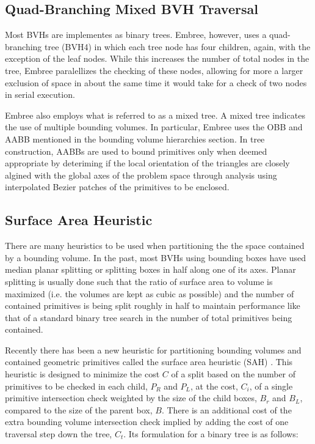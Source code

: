 \documentclass{anstrans}
\begin{document}
\subsection{Quad-Branching Mixed BVH Traversal}

Most BVHs are implementes as binary trees. Embree, however, uses a quad-branching tree (BVH4) in which each tree node has four children, again, with the exception of the leaf nodes. While this increases the number of total nodes in the tree, Embree paralellizes the checking of these nodes, allowing for more a larger exclusion of space in about the same time it would take for a check of two nodes in serial execution. 

Embree also employs what is referred to as a mixed tree. A mixed tree indicates the use of multiple bounding volumes. In particular, Embree uses the OBB and AABB mentioned in the bounding volume hierarchies section. In tree construction, AABBs are used to bound primitives only when deemed appropriate by deteriming if the local orientation of the triangles are closely algined with the global axes of the problem space through analysis using interpolated Bezier patches of the primitives to be enclosed. \cite{embree}

\subsection{Surface Area Heuristic}

There are many heuristics to be used when partitioning the the space contained by a bounding volume. In the past, most BVHs using bounding boxes have used median planar splitting or splitting boxes in half along one of its axes. Planar splitting is usually done such that the ratio of surface area to volume is maximized (i.e. the volumes are kept as cubic as possible) and the number of contained primitives is being split roughly in half to maintain performance like that of a standard binary tree search in the number of total primitives being contained. 

Recently there has been a new heuristic for partitioning bounding volumes and contained geometric primitives called the surface area heuristic (SAH) \cite{sah}. This heuristic is designed to minimize the cost $C$ of a split based on the number of primitives to be checked in each child, $P_{R}$ and $P_{L}$, at the cost, $C_{i}$, of a single primitive intersection check weighted by the size of the child boxes, $B_{r}$ and $B_{L}$, compared to the size of the parent box, $B$. There is an additional cost of the extra bounding volume intersection check implied by adding the cost of one traversal step down the tree, $C_{t}$.
Its formulation for a binary tree is as follows: 
\end{document}

